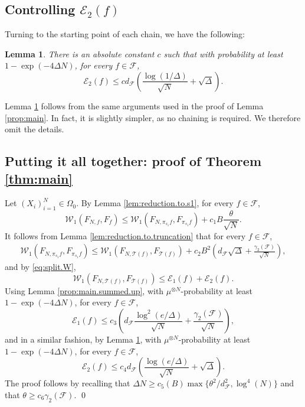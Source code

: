 \documentclass[11pt]{amsart}
\newcommand{\W}{\mathcal{W}}
\newtheorem{lemma}[theorem]{Lemma}
\theoremstyle{definition}
\numberwithin{equation}{section}
\begin{document}
\subsection{Controlling $\mathcal{E}_{2}(f)$}

Turning to the starting point of each chain, we have the following:

\begin{lemma}
\label{prop:start.of.chain}
	There is an absolute constant $c$ such that with probability at least $1-\exp(-4\Delta N)$, for every $f\in\mathcal{F}$,
\[ \mathcal{E}_{2}(f) \leq c d_{\mathcal{F}} \left(   \frac{\log(1/\Delta )}{\sqrt N} +\sqrt\Delta \right). \]
\end{lemma}

Lemma \ref{prop:start.of.chain} follows from the same arguments used in the proof of Lemma \ref{prop:main}.
In fact, it is slightly simpler, as no chaining is required.
We therefore omit the details. 


\subsection{Putting it all together: proof of Theorem \ref{thm:main}}
%
	Let $(X_{i})_{i=1}^{N}\in\Omega_{0}$.
	By Lemma \ref{lem:reduction.to.s1},  for every $f\in\mathcal{F}$, 
\[ \W_{1}(F_{N,f}, F_{f} )
\leq  \W_{1}(F_{N,\pi_{s_{1}} f}, F_{\pi_{s_{1}} f} ) + c_{1}B \frac{\theta}{\sqrt N}.\]
	It follows from Lemma \ref{lem:reduction.to.truncation} that for every $f\in\mathcal{F}$,
\begin{align*}
 \W_{1}(F_{N,\pi_{s_{1}}f}, F_{\pi_{s_{1}}f}) 
\leq \W_{1}(F_{N,\mathcal{T}(f)}, F_{\mathcal{T}(f)} ) + c_{2}B^{2}\left( d_{\mathcal{F}} \sqrt\Delta + \frac{\gamma_{2}(\mathcal{F})}{\sqrt N}\right),
\end{align*} 
	and by \eqref{eq:split.W},
	\[\W_{1}(F_{N,\mathcal{T}(f)}, F_{\mathcal{T}(f)} )\leq \mathcal{E}_{1}(f)+\mathcal{E}_{2}(f).\]
	 Using Lemma \ref{prop:main.summed.up}, with $\mu^{\otimes N}$-probability at least $1-\exp(-4\Delta N)$, for every $f\in\mathcal{F}$, 
	\[ \mathcal{E}_{1}(f)
	 \leq 
	 c_{3} \left(   d_{\mathcal{F}}\frac{  \log^{2}(e/\Delta  )}{\sqrt N} + \frac{\gamma_{2}(\mathcal{F})}{\sqrt N} \right),\] 
	 and in a similar fashion, by Lemma \ref{prop:start.of.chain}, with $\mu^{\otimes N}$-probability at least $1-\exp(-4\Delta N)$, for every $f\in\mathcal{F}$, 
	\[ \mathcal{E}_{2}(f)
	 \leq c_{4} d_{\mathcal{F}} \left( \frac{\log(e/\Delta)}{\sqrt N} + \sqrt\Delta \right).\] 
	The proof follows by recalling that  $\Delta N \geq c_5(B) \max\{\theta^{2} / d_{\mathcal{F}}^{2}, \log^{4}(N)\}$  and that $\theta\geq c_6 \gamma_{2}(\mathcal{F})$.
\qed
%
\end{document}
